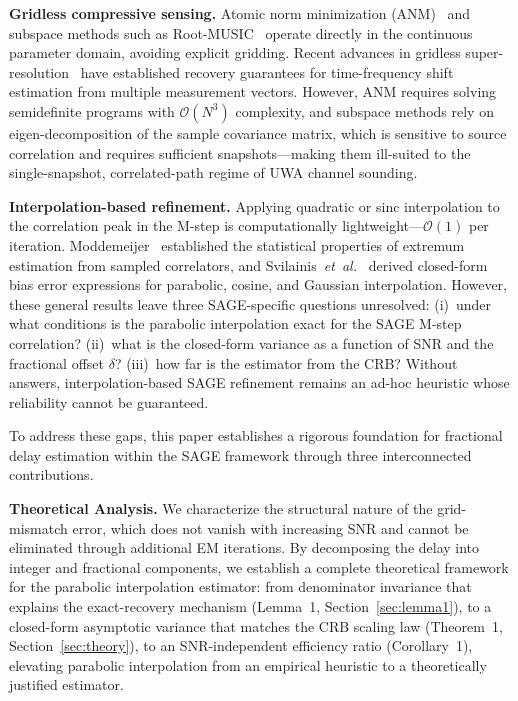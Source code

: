 \documentclass[a4paper,fleqn]{cas-dc}
\newcommand{\bigO}{\mathcal{O}}
\begin{document}
\textbf{Gridless compressive sensing.} Atomic norm minimization (ANM)~\cite{tang2013,chi2020} and subspace methods such as Root-MUSIC~\cite{schmidt1986} operate directly in the continuous parameter domain, avoiding explicit gridding. Recent advances in gridless super-resolution~\cite{chi2020,safari2021} have established recovery guarantees for time-frequency shift estimation from multiple measurement vectors. However, ANM requires solving semidefinite programs with $\bigO(N^3)$ complexity, and subspace methods rely on eigen-decomposition of the sample covariance matrix, which is sensitive to source correlation and requires sufficient snapshots---making them ill-suited to the single-snapshot, correlated-path regime of UWA channel sounding.

\textbf{Interpolation-based refinement.} Applying quadratic or sinc interpolation to the correlation peak in the M-step is computationally lightweight---$\bigO(1)$ per iteration. Moddemeijer~\cite{moddemeijer1991} established the statistical properties of extremum estimation from sampled correlators, and Svilainis~\textit{et~al.}~\cite{svilainis2013} derived closed-form bias error expressions for parabolic, cosine, and Gaussian interpolation. However, these general results leave three SAGE-specific questions unresolved: (i)~under what conditions is the parabolic interpolation exact for the SAGE M-step correlation? (ii)~what is the closed-form variance as a function of SNR and the fractional offset $\delta$? (iii)~how far is the estimator from the CRB? Without answers, interpolation-based SAGE refinement remains an ad-hoc heuristic whose reliability cannot be guaranteed.

To address these gaps, this paper establishes a rigorous foundation for fractional delay estimation within the SAGE framework through three interconnected contributions.

\noindent\textbf{Theoretical Analysis.} We characterize the structural nature of the grid-mismatch error, which does not vanish with increasing SNR and cannot be eliminated through additional EM iterations. By decomposing the delay into integer and fractional components, we establish a complete theoretical framework for the parabolic interpolation estimator: from denominator invariance that explains the exact-recovery mechanism (Lemma~1, Section~\ref{sec:lemma1}), to a closed-form asymptotic variance that matches the CRB scaling law (Theorem~1, Section~\ref{sec:theory}), to an SNR-independent efficiency ratio (Corollary~1), elevating parabolic interpolation from an empirical heuristic to a theoretically justified estimator.
\end{document}
